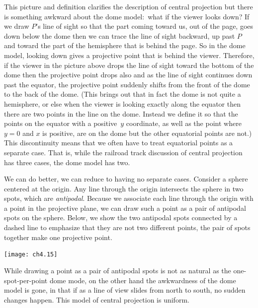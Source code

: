 This picture and definition
clarifies the description of central projection
but there is something awkward about the dome 
model:~what if the viewer looks down?
If we draw $P$'s line of sight so that the part 
coming toward us, out of the page,
goes down below the dome then we can trace
the line of sight backward, up past $P$ and toward the part of the
hemisphere that is behind the page.
So in the dome model, looking down gives a projective point 
that is behind the viewer. 
Therefore, if the viewer in the picture above
drops the line of sight toward the bottom of the
dome then the projective point drops also and as
the line of sight continues down past the equator, the projective point
suddenly shifts from the front of the dome to the back of the dome.
(This brings out that in fact the dome is not quite a hemisphere, or else
when the viewer is looking exactly along the equator then there are 
two points in the line on the dome. 
Instead we define it so that the
points on the equator with a positive~$y$ coordinate, as well as the point
where $y=0$ and $x$ is positive, are on the dome but the other equatorial
points are not.)
This discontinuity means that
we often have to treat equatorial points as a separate case.
That is, while the railroad track discussion of central projection
has three cases,
the dome model has two.

We can do better, we can reduce to having no separate cases.
Consider a sphere centered at the origin.
Any line through the origin intersects the sphere in two spots, which
are \emph{antipodal}.
Because we associate each line through the origin 
with a point in the projective 
plane, we can draw such a point as a pair of antipodal spots on the sphere. 
Below, we show the two antipodal spots connected by a dashed line
to emphasize that they are not two 
different points, the pair of spots together make one projective point.
\begin{center}
  \texttt{[image: ch4.15]}
\end{center}
While drawing a point as a pair of antipodal 
spots is not as natural as the one-spot-per-point dome mode,
on the other hand
the awkwardness of the dome model is gone, in that if 
as a line of view slides from north to south, 
no sudden changes happen.
This model of central projection is uniform.

